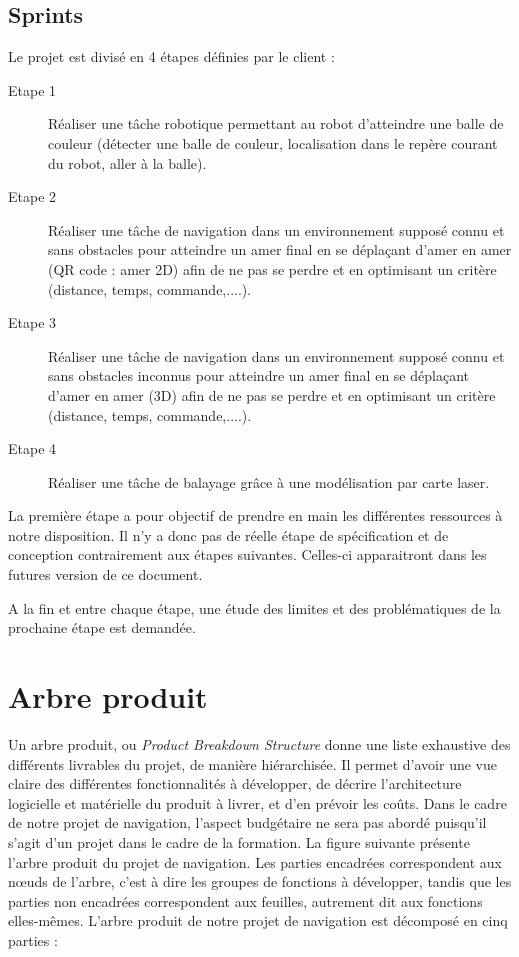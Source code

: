 \documentclass[10pt,a4paper]{article}
\begin{document}
\subsection{Sprints}

\noindent Le projet est divisé en 4 étapes définies par le client : 

\begin{description}

\item [Etape 1] Réaliser une tâche robotique permettant au robot d’atteindre une balle de couleur (détecter une balle de couleur, localisation dans le repère courant du robot, aller à la balle).

\item [Etape 2] Réaliser une tâche de navigation dans un environnement supposé connu et sans obstacles pour atteindre un amer final en se déplaçant d’amer en amer (QR code : amer 2D) afin de ne pas se perdre et en optimisant un critère (distance, temps, commande,....).

\item [Etape 3] Réaliser une tâche de navigation dans un environnement supposé connu et sans obstacles inconnus pour atteindre un amer final en se déplaçant d’amer en amer (3D) afin de ne pas se perdre et en optimisant un critère (distance, temps, commande,....).

\item [Etape 4] Réaliser une tâche de balayage grâce à une modélisation par carte laser.

\end{description}

La première étape a pour objectif de prendre en main les différentes ressources à notre disposition. Il n'y a donc pas de réelle étape de spécification et de conception contrairement aux étapes suivantes. Celles-ci apparaitront dans les futures version de ce document.

A la fin et entre chaque étape, une étude des limites et des problématiques de la prochaine étape est demandée.



\section{Arbre produit}

Un arbre produit, ou \textit{Product Breakdown Structure} donne une liste exhaustive des différents livrables du projet, de manière hiérarchisée. Il permet d’avoir une vue claire des différentes fonctionnalités à développer, de décrire l’architecture logicielle et matérielle du produit à livrer, et d’en prévoir les coûts. Dans le cadre de notre projet de navigation, l’aspect budgétaire ne sera pas abordé puisqu’il s’agit d’un projet dans le cadre de la formation.
La figure suivante présente l’arbre produit du projet de navigation. Les parties encadrées correspondent aux nœuds de l’arbre, c’est à dire les groupes de fonctions à développer, tandis que les parties non encadrées correspondent aux feuilles, autrement dit aux fonctions elles-mêmes.
L’arbre produit de notre projet de navigation est décomposé en cinq parties :
\end{document}
